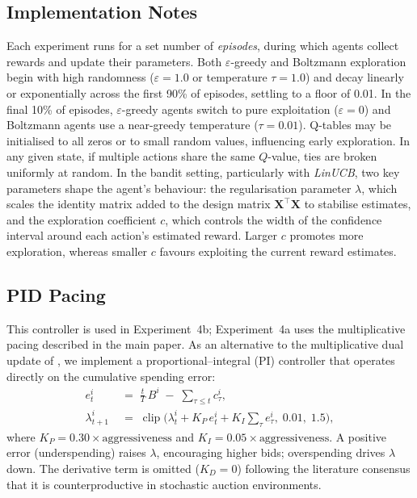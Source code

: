 \subsection{Implementation Notes}

Each experiment runs for a set number of \emph{episodes}, during which agents collect rewards and update their parameters. Both $\varepsilon$-greedy and Boltzmann exploration begin with high randomness ($\varepsilon = 1.0$ or temperature $\tau = 1.0$) and decay linearly or exponentially across the first 90\% of episodes, settling to a floor of 0.01. In the final 10\% of episodes, $\varepsilon$-greedy agents switch to pure exploitation ($\varepsilon = 0$) and Boltzmann agents use a near-greedy temperature ($\tau = 0.01$). Q-tables may be initialised to all zeros or to small random values, influencing early exploration. In any given state, if multiple actions share the same $Q$-value, ties are broken uniformly at random. In the bandit setting, particularly with \emph{LinUCB}, two key parameters shape the agent's behaviour: the regularisation parameter $\lambda$, which scales the identity matrix added to the design matrix $\mathbf{X}^\top \mathbf{X}$ to stabilise estimates, and the exploration coefficient $c$, which controls the width of the confidence interval around each action's estimated reward. Larger $c$ promotes more exploration, whereas smaller $c$ favours exploiting the current reward estimates.

\subsection{PID Pacing}

This controller is used in Experiment~4b; Experiment~4a uses the multiplicative pacing described in the main paper. As an alternative to the multiplicative dual update of \citet{Balseiro2019Learning}, we implement a proportional--integral (PI) controller that operates directly on the cumulative spending error:
\begin{align}
e_t^i &\;=\; \tfrac{t}{T}\,B^i \;-\; {\textstyle\sum_{\tau \le t}} c_\tau^i, \label{eq:pid_error}\\
\lambda_{t+1}^i &\;=\; \operatorname{clip}\!\bigl(\lambda_t^i + K_P\,e_t^i + K_I\!\textstyle\sum_{\tau} e_\tau^i,\; 0.01,\; 1.5\bigr), \label{eq:pid_update}
\end{align}
where $K_P = 0.30\times\text{aggressiveness}$ and $K_I = 0.05\times\text{aggressiveness}$. A positive error (underspending) raises $\lambda$, encouraging higher bids; overspending drives $\lambda$ down. The derivative term is omitted ($K_D = 0$) following the literature consensus that it is counterproductive in stochastic auction environments.
